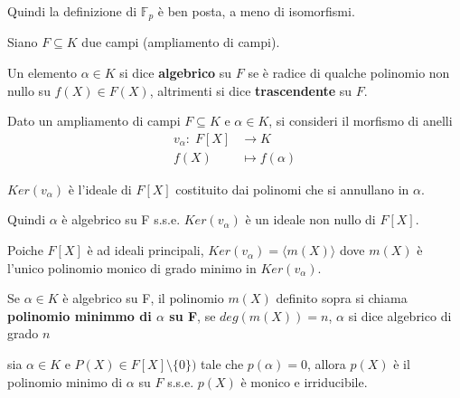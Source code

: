 \documentclass[../main.tex]{subfiles}
\begin{document}
Quindi la definizione di $\mathbb{F}_p$ è ben posta, a meno di isomorfismi.

\begin{definition}
    Siano $F \subseteq K$ due campi (ampliamento di campi).

    Un elemento $\alpha \in K$ si dice \textbf{algebrico} su $F$ se è radice di qualche polinomio non nullo su $f(X) \in F(X)$, altrimenti si dice \textbf{trascendente} su $F$.
\end{definition}

Dato un ampliamento di campi $F \subseteq K$ e  $\alpha \in K$, si consideri il morfismo di anelli
\begin{align*}
    v_\alpha : \; F[X] & \rightarrow K     \\
    f(X)               & \mapsto f(\alpha)
\end{align*}

$Ker(v_\alpha)$ è l'ideale di $F[X]$ costituito dai polinomi che si annullano in $\alpha$.

Quindi $\alpha$ è algebrico su F s.s.e. $Ker(v_\alpha)$ è un ideale non nullo di $F[X]$.

Poiche $F[X]$ è ad ideali principali, $Ker(v_\alpha) = \langle m(X)\rangle$ dove $m(X)$ è l'unico polinomio monico di grado minimo in $Ker(v_\alpha)$.

\begin{definition}
    Se $\alpha \in K$ è algebrico su F, il polinomio $m(X)$ definito sopra si chiama \textbf{polinomio minimmo di $\alpha$ su F}, se $deg(m(X)) = n$, $\alpha $ si dice algebrico di grado $n$
\end{definition}

\begin{note}
    sia $\alpha \in K$ e $P(X) \in F[X] \setminus \{0\})$ tale che $p(\alpha) = 0$, allora $p(X)$ è il polinomio minimo di $\alpha$ su $F$ s.s.e. $p(X)$ è monico e irriducibile.
\end{note}
\end{document}
